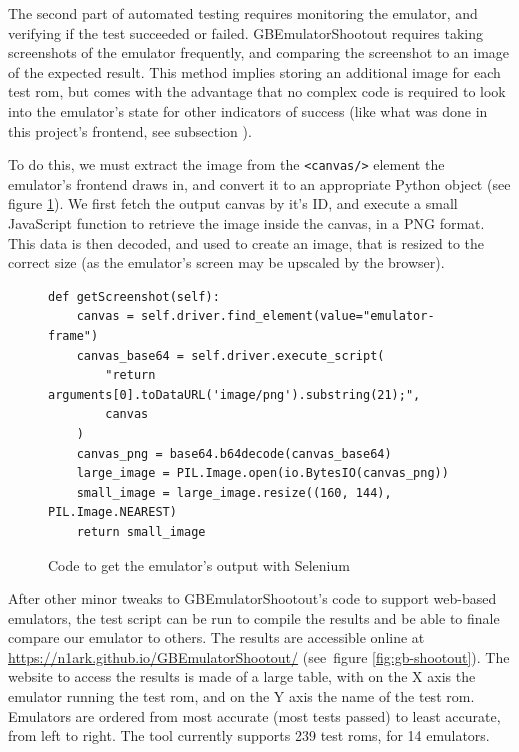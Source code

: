 \documentclass[11pt]{informatics-report}
\begin{document}
The second part of automated testing requires monitoring the emulator, and verifying if the test succeeded or failed. GBEmulatorShootout requires taking screenshots of the emulator frequently, and comparing the screenshot to an image of the expected result. This method implies storing an additional image for each test \gls{rom}, but comes with the advantage that no complex code is required to look into the emulator's state for other indicators of success (like what was done in this project's frontend, see subsection ).

To do this, we must extract the image from the \texttt{<canvas/>} element the emulator's frontend draws in, and convert it to an appropriate Python object (see figure \ref{fig:selenium-screenshot}). We first fetch the output canvas by it's ID, and execute a small JavaScript function to retrieve the image inside the canvas, in a PNG format. This data is then decoded, and used to create an image, that is resized to the correct size (as the emulator's screen may be upscaled by the browser).

\begin{figure}[h]
    \begin{verbatim}
def getScreenshot(self):
    canvas = self.driver.find_element(value="emulator-frame")
    canvas_base64 = self.driver.execute_script(
    	"return arguments[0].toDataURL('image/png').substring(21);",
    	canvas
    )
    canvas_png = base64.b64decode(canvas_base64)
    large_image = PIL.Image.open(io.BytesIO(canvas_png))
    small_image = large_image.resize((160, 144), PIL.Image.NEAREST)
    return small_image
    \end{verbatim}
    \caption{Code to get the emulator's output with Selenium}
    \label{fig:selenium-screenshot}
\end{figure}

After other minor tweaks to GBEmulatorShootout's code to support web-based emulators, the test script can be run to compile the results and be able to finale compare our emulator to others. The results are accessible online at \url{https://n1ark.github.io/GBEmulatorShootout/} (see~figure \ref{fig:gb-shootout}). The website to access the results is made of a large table, with on the X axis the emulator running the test \gls{rom}, and on the Y axis the name of the test \gls{rom}. Emulators are ordered from most accurate (most tests passed) to least accurate, from left to right. The tool currently supports 239 test \glspl{rom}, for 14 emulators.
\end{document}

